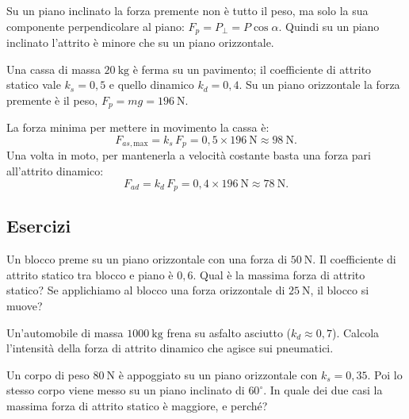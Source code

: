 \begin{remark}
Su un piano inclinato la forza premente non è tutto il peso, ma solo la sua componente perpendicolare al piano: $F_p = P_\perp = P\cos\alpha$. Quindi su un piano inclinato l'attrito è minore che su un piano orizzontale.
\end{remark}

\begin{testexample}
Una cassa di massa $\SI{20}{\kilo\gram}$ è ferma su un pavimento; il coefficiente di attrito statico vale $k_s = 0,5$ e quello dinamico $k_d = 0,4$. Su un piano orizzontale la forza premente è il peso, $F_p = mg = \SI{196}{\newton}$.

La forza minima per mettere in movimento la cassa è:
\[
F_{as,\text{max}} = k_s\, F_p = 0,5 \times \SI{196}{\newton} \approx \SI{98}{\newton}.
\]
Una volta in moto, per mantenerla a velocità costante basta una forza pari all'attrito dinamico:
\[
F_{ad} = k_d\, F_p = 0,4 \times \SI{196}{\newton} \approx \SI{78}{\newton}.
\]
\end{testexample}

\subsection{Esercizi}

\begin{esercizio}
Un blocco preme su un piano orizzontale con una forza di $\SI{50}{\newton}$. Il coefficiente di attrito statico tra blocco e piano è $0,6$. Qual è la massima forza di attrito statico? Se applichiamo al blocco una forza orizzontale di $\SI{25}{\newton}$, il blocco si muove?\\
\end{esercizio}

\begin{esercizio}
Un'automobile di massa $\SI{1000}{\kilo\gram}$ frena su asfalto asciutto ($k_d \approx 0,7$). Calcola l'intensità della forza di attrito dinamico che agisce sui pneumatici.\\
\end{esercizio}

\begin{esercizio}
Un corpo di peso $\SI{80}{\newton}$ è appoggiato su un piano orizzontale con $k_s = 0,35$. Poi lo stesso corpo viene messo su un piano inclinato di $60^\circ$. In quale dei due casi la massima forza di attrito statico è maggiore, e perché?\\
\end{esercizio}

